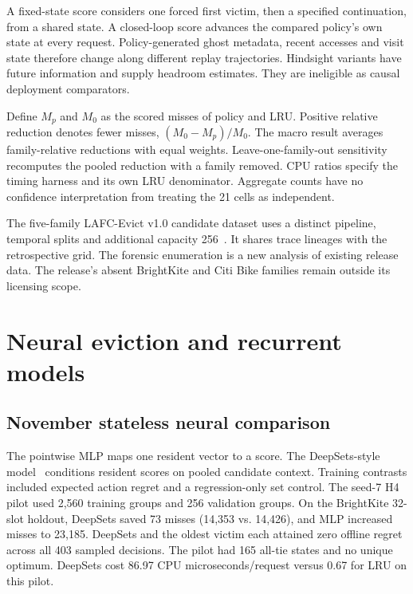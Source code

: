 \documentclass[11pt,letterpaper]{article}
\begin{document}
A fixed-state score considers one forced first victim, then a specified continuation, from a shared state. A closed-loop score advances the compared policy's own state at every request. Policy-generated ghost metadata, recent accesses and visit state therefore change along different replay trajectories. Hindsight variants have future information and supply headroom estimates. They are ineligible as causal deployment comparators.

Define \(M_p\) and \(M_0\) as the scored misses of policy and LRU. Positive relative reduction denotes fewer misses, \((M_0-M_p)/M_0\). The macro result averages family-relative reductions with equal weights. Leave-one-family-out sensitivity recomputes the pooled reduction with a family removed. CPU ratios specify the timing harness and its own LRU denominator. Aggregate counts have no confidence interpretation from treating the 21 cells as independent.

The five-family LAFC-Evict v1.0 candidate dataset uses a distinct pipeline, temporal splits and additional capacity 256~\cite{lafc}. It shares trace lineages with the retrospective grid. The forensic enumeration is a new analysis of existing release data. The release's absent BrightKite and Citi Bike families remain outside its licensing scope.

\section{Neural eviction and recurrent models}
\subsection{November stateless neural comparison}
The pointwise MLP maps one resident vector to a score. The DeepSets-style model~\cite{deepsets} conditions resident scores on pooled candidate context. Training contrasts included expected action regret and a regression-only set control. The seed-7 H4 pilot used 2,560 training groups and 256 validation groups. On the BrightKite 32-slot holdout, DeepSets saved 73 misses (14,353 vs. 14,426), and MLP increased misses to 23,185. DeepSets and the oldest victim each attained zero offline regret across all 403 sampled decisions. The pilot had 165 all-tie states and no unique optimum. DeepSets cost 86.97 CPU microseconds/request versus 0.67 for LRU on this pilot.
\end{document}

